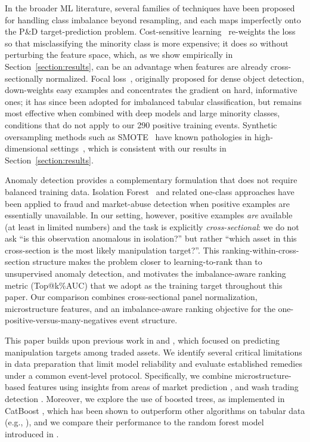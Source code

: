 \documentclass{ieeeaccess}
\begin{document}
In the broader ML literature, several families of techniques have been proposed for handling class imbalance beyond resampling, and each maps imperfectly onto the P\&D target-prediction problem. Cost-sensitive learning~\cite{elkan2001cost} re-weights the loss so that misclassifying the minority class is more expensive; it does so without perturbing the feature space, which, as we show empirically in Section~\ref{section:results}, \textcolor{revisionblue}{can be an} advantage when features are already cross-sectionally normalized. Focal loss~\cite{lin2017focal}, originally proposed for dense object detection, down-weights easy examples and concentrates the gradient on hard, informative ones; it has since been adopted for imbalanced tabular classification, but remains most effective when combined with deep models and large minority classes, conditions that do not apply to our 290 positive training events. Synthetic oversampling methods such as SMOTE~\cite{chawla2002smote} have known pathologies in high-dimensional settings~\cite{blagus2013smote}, which \textcolor{revisionblue}{is consistent with our results} in Section~\ref{section:results}.

Anomaly detection provides a complementary formulation that does not require balanced training data. Isolation Forest~\cite{liu2008isolation} and related one-class approaches have been applied to fraud and market-abuse detection when positive examples are essentially unavailable. In our setting, however, positive examples \emph{are} available (at least in limited numbers) and the task is explicitly \emph{cross-sectional}: we do not ask ``is this observation anomalous in isolation?'' but rather ``which asset in this cross-section is the most likely manipulation target?''. This ranking-within-cross-section structure makes the problem closer to learning-to-rank than to unsupervised anomaly detection, and motivates the imbalance-aware ranking metric (Top@k\%AUC) that we adopt as the training target throughout this paper. \textcolor{revisionblue}{Our comparison combines cross-sectional panel normalization, microstructure features, and an imbalance-aware ranking objective for} the \textcolor{revisionblue}{one-positive-versus-many-negatives event structure.}


This paper builds upon previous work in \cite{pd_anatomy} and \cite{hu2023sequence}, which focused on predicting manipulation targets among traded assets. We identify several critical limitations in data preparation that limit model reliability and \textcolor{revisionblue}{evaluate established remedies under a common event-level protocol.} Specifically, we \textcolor{revisionblue}{combine} microstructure-based features \textcolor{revisionblue}{using} insights from areas of market prediction \cite{albers_frag_2022}, \cite{ntakaris_midprice_2022} and wash trading detection \cite{cong_washtrading_2023}. Moreover, we explore the use of boosted trees, as implemented in CatBoost \cite{catboost}, which has been shown to outperform other algorithms on tabular data (e.g., \cite{grinsztajn_2022}), and we compare their performance to the random forest model introduced in \cite{random_forest_2001}.
\end{document}

